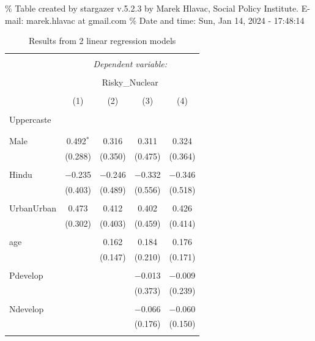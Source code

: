 \documentclass[
]{article}
\begin{document}
\begingroup\setlength{\tabcolsep}{1pt}

\renewcommand{\arraystretch}{0.7}

\% Table created by stargazer v.5.2.3 by Marek Hlavac, Social Policy
Institute. E-mail: marek.hlavac at gmail.com \% Date and time: Sun, Jan
14, 2024 - 17:48:14

\begin{table}[!htbp] \centering 
  \caption{Results from 2 linear regression models} 
  \label{} 
\begin{tabular}{@{\extracolsep{5pt}}lcccc} 
\\[-1.8ex]\hline 
\hline \\[-1.8ex] 
 & \multicolumn{4}{c}{\textit{Dependent variable:}} \\ 
\cline{2-5} 
\\[-1.8ex] & \multicolumn{4}{c}{Risky\_Nuclear} \\ 
\\[-1.8ex] & (1) & (2) & (3) & (4)\\ 
\hline \\[-1.8ex] 
 Uppercaste &  &  &  &  \\ 
  &  &  &  &  \\ 
  & & & & \\ 
 Male & 0.492$^{*}$ & 0.316 & 0.311 & 0.324 \\ 
  & (0.288) & (0.350) & (0.475) & (0.364) \\ 
  & & & & \\ 
 Hindu & $-$0.235 & $-$0.246 & $-$0.332 & $-$0.346 \\ 
  & (0.403) & (0.489) & (0.556) & (0.518) \\ 
  & & & & \\ 
 UrbanUrban & 0.473 & 0.412 & 0.402 & 0.426 \\ 
  & (0.302) & (0.403) & (0.459) & (0.414) \\ 
  & & & & \\ 
 age &  & 0.162 & 0.184 & 0.176 \\ 
  &  & (0.147) & (0.210) & (0.171) \\ 
  & & & & \\ 
 Pdevelop &  &  & $-$0.013 & $-$0.009 \\ 
  &  &  & (0.373) & (0.239) \\ 
  & & & & \\ 
 Ndevelop &  &  & $-$0.066 & $-$0.060 \\ 
  &  &  & (0.176) & (0.150) \\ 
  & & & & \\ 

\end{tabular}
\end{table}
\end{document}
